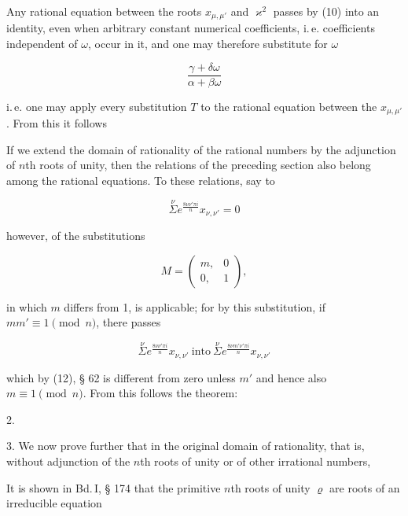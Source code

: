 Any rational equation between the roots $x_{\mu,\mu'}$ and $\varkappa^2$ passes by (10) into an identity, even when arbitrary constant numerical coefficients, i.\,e. coefficients independent of $\omega$, occur in it, and one may therefore substitute for $\omega$

\[
\frac{\gamma + \delta\omega}{\alpha + \beta\omega}
\]

i.\,e. one may apply every substitution $T$ to the rational equation between the $x_{\mu,\mu'}$. From this it follows 

If we extend the domain of rationality of the rational numbers by the adjunction of $n$th roots of unity, then the  relations of the preceding section also belong among the rational equations. To these relations, say to

\[
\overset{\nu}{\Sigma} e^{\frac{8\nu\nu'\pi i}{n}} x_{\nu,\nu'} = 0
\]

however,  of the substitutions

\[
M = \begin{pmatrix} m, & 0 \\ 0, & 1 \end{pmatrix},
\]

in which $m$ differs from 1, %
is applicable; for by this substitution, if $mm' \equiv 1 \pmod{n}$, there passes

\[
\overset{\nu}{\Sigma} e^{\frac{8\nu\nu'\pi i}{n}} x_{\nu,\nu'} \ \text{into} \ \overset{\nu}{\Sigma} e^{\frac{8\nu m'\nu'\pi i}{n}} x_{\nu,\nu'}
\]

which by (12), § 62 is different from zero unless $m'$ and hence also $m \equiv 1 \pmod{n}$. From this follows the theorem:

2. 

3. We now prove further that in the original domain of rationality, that is, without adjunction of the $n$th roots of unity or of other irrational numbers, 

It is shown in Bd.\,I, § 174 that the primitive $n$th roots of unity $\varrho$ are roots of an irreducible equation

